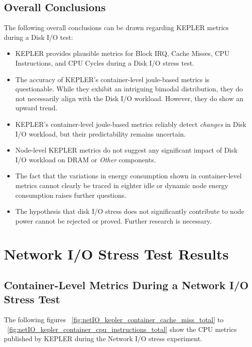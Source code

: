 \subsection{Overall Conclusions}

The following overall conclusions can be drawn regarding KEPLER metrics during a Disk I/O test:

\begin{itemize}
    \item KEPLER provides plausible metrics for Block IRQ, Cache Misses, CPU Instructions, and CPU Cycles during a Disk I/O stress test.
    \item The accuracy of KEPLER’s container-level joule-based metrics is questionable. While they exhibit an intriguing bimodal distribution, they do not necessarily align with the Disk I/O workload. However, they do show an upward trend.
    \item KEPLER’s container-level joule-based metrics reliably detect \textit{changes} in Disk I/O workload, but their predictability remains uncertain.
    \item Node-level KEPLER metrics do not suggest any significant impact of Disk I/O workload on DRAM or \textit{Other} components.
    \item The fact that the variations in energy consumption shown in container-level metrics cannot clearly be traced in eighter idle or dynamic node energy consumption raises further questions.
    \item The hypothesis that disk I/O stress does not significantly contribute to node power cannot be rejected or proved. Further research is necessary.
\end{itemize}

\section{Network I/O Stress Test Results}

\subsection{Container-Level Metrics During a Network I/O Stress Test}

The following figures ~\ref{fig:netIO_kepler_container_cache_miss_total} to ~\ref{fig:netIO_kepler_container_cpu_instructions_total} show the CPU metrics published by KEPLER during the Network I/O stress experiment.


